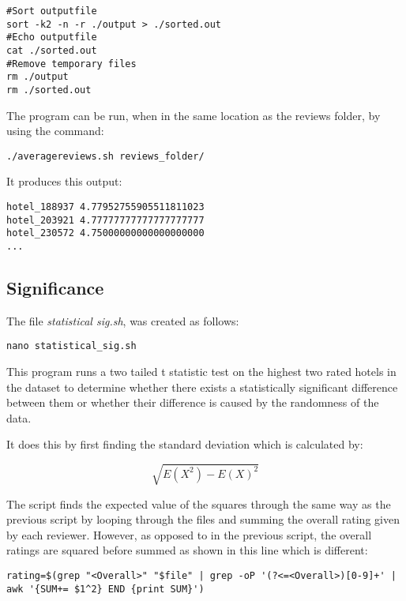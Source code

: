 \documentclass{article}
\begin{document}
\begin{lstlisting}
#Sort outputfile
sort -k2 -n -r ./output > ./sorted.out
#Echo outputfile
cat ./sorted.out
#Remove temporary files
rm ./output
rm ./sorted.out
\end{lstlisting}

The program can be run, when in the same location as the reviews folder, by using the command:

\begin{lstlisting}
./averagereviews.sh reviews_folder/
\end{lstlisting}

It produces this output:

\begin{lstlisting}
hotel_188937 4.77952755905511811023
hotel_203921 4.77777777777777777777
hotel_230572 4.75000000000000000000
...
\end{lstlisting}

\subsection{Significance}

The file \textit{statistical \textunderscore sig.sh}, was created as follows:

\begin{lstlisting}
nano statistical_sig.sh
\end{lstlisting}

This program runs a two tailed t statistic test on the highest two rated hotels in the dataset to determine whether there exists a statistically significant difference between them or whether their difference is caused by the randomness of the data. \par It does this by first finding the standard deviation which is calculated by:

\begin{equation}
\sqrt{E(X^{2}) - E(X)^{2}}
\end{equation}

The script finds the expected value of the squares through the same way as the previous script by looping through the files and summing the overall rating given by each reviewer. However, as opposed to in the previous script, the overall ratings are squared before summed as shown in this line which is different:

\begin{lstlisting}
rating=$(grep "<Overall>" "$file" | grep -oP '(?<=<Overall>)[0-9]+' | awk '{SUM+= $1^2} END {print SUM}')
\end{lstlisting}
\end{document}
